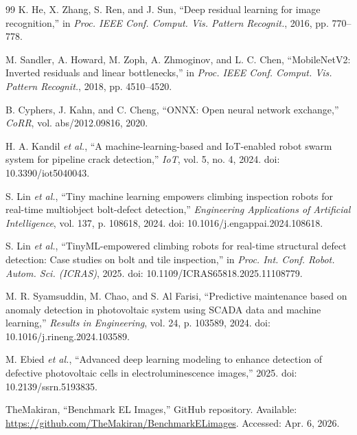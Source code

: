 \documentclass[journal]{IEEEtran}
\begin{document}
\begin{thebibliography}{99}
 K. He, X. Zhang, S. Ren, and J. Sun, ``Deep residual learning for image recognition,'' in \emph{Proc. IEEE Conf. Comput. Vis. Pattern Recognit.}, 2016, pp. 770--778.

 M. Sandler, A. Howard, M. Zoph, A. Zhmoginov, and L. C. Chen, ``MobileNetV2: Inverted residuals and linear bottlenecks,'' in \emph{Proc. IEEE Conf. Comput. Vis. Pattern Recognit.}, 2018, pp. 4510--4520.

 B. Cyphers, J. Kahn, and C. Cheng, ``ONNX: Open neural network exchange,'' \emph{CoRR}, vol. abs/2012.09816, 2020.

 H. A. Kandil \emph{et al.}, ``A machine-learning-based and IoT-enabled robot swarm system for pipeline crack detection,'' \emph{IoT}, vol. 5, no. 4, 2024. doi: 10.3390/iot5040043.

 S. Lin \emph{et al.}, ``Tiny machine learning empowers climbing inspection robots for real-time multiobject bolt-defect detection,'' \emph{Engineering Applications of Artificial Intelligence}, vol. 137, p. 108618, 2024. doi: 10.1016/j.engappai.2024.108618.

 S. Lin \emph{et al.}, ``TinyML-empowered climbing robots for real-time structural defect detection: Case studies on bolt and tile inspection,'' in \emph{Proc. Int. Conf. Robot. Autom. Sci. (ICRAS)}, 2025. doi: 10.1109/ICRAS65818.2025.11108779.

 M. R. Syamsuddin, M. Chao, and S. Al Farisi, ``Predictive maintenance based on anomaly detection in photovoltaic system using SCADA data and machine learning,'' \emph{Results in Engineering}, vol. 24, p. 103589, 2024. doi: 10.1016/j.rineng.2024.103589.

 M. Ebied \emph{et al.}, ``Advanced deep learning modeling to enhance detection of defective photovoltaic cells in electroluminescence images,'' 2025. doi: 10.2139/ssrn.5193835.

 TheMakiran, ``Benchmark EL Images,'' GitHub repository. Available: \url{https://github.com/TheMakiran/BenchmarkELimages}. Accessed: Apr. 6, 2026.

\end{thebibliography}
\end{document}
